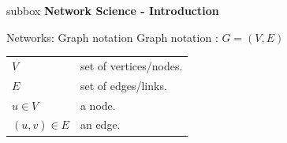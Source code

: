 \documentclass[a4paper,11pt]{book}
\begin{document}

\newpage



\begin{subbox}{subbox}{}
\centering
\Large{\textbf{Network Science -  Introduction}}
\end{subbox}


\begin{textbox}{Networks: Graph notation}
Graph notation : $G=(V,E)$

\begin{tabular}{p{}|p{}}\scriptsize


 $V$ & set of vertices/nodes. \\
 $E$ &  set of edges/links. \\
 $u\in V$ & a node. \\
 $(u,v) \in E$ & an edge. \\
\end{tabular}
\end{textbox}
\end{document}

